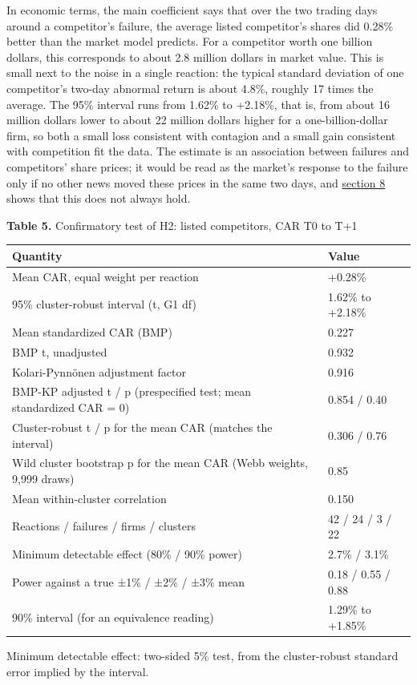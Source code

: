\documentclass[12pt,a4paper]{article}
\begin{document}
In economic terms, the main coefficient says that over the two trading days around a competitor's failure, the average listed competitor's shares did 0.28\% better than the market model predicts. For a competitor worth one billion dollars, this corresponds to about 2.8 million dollars in market value. This is small next to the noise in a single reaction: the typical standard deviation of one competitor's two-day abnormal return is about 4.8\%, roughly 17 times the average. The 95\% interval runs from \textminus{}1.62\% to +2.18\%, that is, from about 16 million dollars lower to about 22 million dollars higher for a one-billion-dollar firm, so both a small loss consistent with contagion and a small gain consistent with competition fit the data. The estimate is an association between failures and competitors' share prices; it would be read as the market's response to the failure only if no other news moved these prices in the same two days, and \hyperlink{s8}{section 8} shows that this does not always hold.

\par\noindent\begin{minipage}{\textwidth}\hypertarget{tab-inf}{}
\textbf{Table 5.} Confirmatory test of H2: listed competitors, CAR T0 to T+1

{\small\setlength{\tabcolsep}{4pt}\begin{tabularx}{\textwidth}{Xl}
\toprule
\textbf{Quantity} & \textbf{Value} \\
\midrule
Mean CAR, equal weight per reaction & +0.28\% \\
95\% cluster-robust interval (t, G\textminus{}1 df) & \textminus{}1.62\% to +2.18\% \\
Mean standardized CAR (BMP) & 0.227 \\
BMP t, unadjusted & 0.932 \\
Kolari-Pynnönen adjustment factor & 0.916 \\
BMP-KP adjusted t / p (prespecified test; mean standardized CAR = 0) & 0.854 / 0.40 \\
Cluster-robust t / p for the mean CAR (matches the interval) & 0.306 / 0.76 \\
Wild cluster bootstrap p for the mean CAR (Webb weights, 9,999 draws) & 0.85 \\
Mean within-cluster correlation & 0.150 \\
Reactions / failures / firms / clusters & 42 / 24 / 3 / 22 \\
Minimum detectable effect (80\% / 90\% power) & 2.7\% / 3.1\% \\
Power against a true ±1\% / ±2\% / ±3\% mean & 0.18 / 0.55 / 0.88 \\
90\% interval (for an equivalence reading) & \textminus{}1.29\% to +1.85\% \\
\bottomrule
\end{tabularx}}
\vspace{6pt}

Minimum detectable effect: two-sided 5\% test, from the cluster-robust standard error implied by the interval.

\end{minipage}\par\vspace{4pt}
\end{document}
